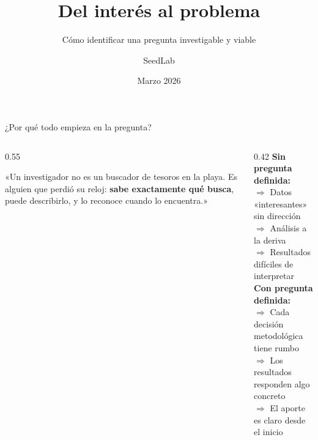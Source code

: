 \documentclass[12pt, aspectratio=169]{beamer}
\title[Del interés al problema]{Del interés al problema}
\subtitle{Cómo identificar una pregunta investigable y viable}
\author[SCORE--UNMSM]{SeedLab}
\institute[SCORE--UNMSM]{SCORE -- UNMSM}
\date{Marzo 2026}
\begin{document}


\begin{frame}
  \titlepage
\end{frame}


\begin{frame}{¿Por qué todo empieza en la pregunta?}
  \begin{columns}[T]
    \begin{column}{0.55\textwidth}
      \begin{keybox}
        \small
        «Un investigador no es un buscador de tesoros en la playa.
        Es alguien que perdió su reloj: \textbf{sabe exactamente qué busca},
        puede describirlo, y lo reconoce cuando lo encuentra.»
        \vspace{2pt}
        \begin{flushright}
          \scriptsize\textit{\textcite{Vandenbroucke2018_ideas}}
        \end{flushright}
      \end{keybox}
    \end{column}
    \begin{column}{0.42\textwidth}
      \vspace{4pt}
      \small                          %
      \textbf{Sin pregunta definida:}\\[2pt]
      $\Rightarrow$ Datos «interesantes» sin dirección\\
      $\Rightarrow$ Análisis a la deriva\\
      $\Rightarrow$ Resultados difíciles de interpretar\\[6pt]
      \textbf{Con pregunta definida:}\\[2pt]
      $\Rightarrow$ Cada decisión metodológica tiene rumbo\\
      $\Rightarrow$ Los resultados responden algo concreto\\
      $\Rightarrow$ El aporte es claro desde el inicio
    \end{column}
  \end{columns}
\end{frame}
\end{document}
